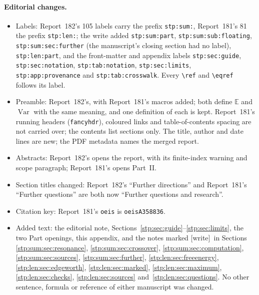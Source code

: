 \documentclass[11pt]{article}
\theoremstyle{remark}\newtheorem{remark}[theorem]{Remark}
\newcommand{\E}{\mathbb E}
\DeclareMathOperator{\Var}{Var}
\newcommand{\wtag}{\textup{[write]}}
\begin{document}
\paragraph{Editorial changes.}
\begin{itemize}
\item Labels: Report~182's 105 labels carry the prefix \texttt{stp:sum:},
Report~181's 81 the prefix \texttt{stp:len:}; the write added
\texttt{stp:sum:part}, \texttt{stp:sum:sub:floating},
\texttt{stp:sum:sec:further} (the manuscript's closing section had no
label), \texttt{stp:len:part}, and the front-matter and appendix labels
\texttt{stp:sec:guide}, \texttt{stp:sec:notation}, \texttt{stp:tab:notation},
\texttt{stp:sec:limits}, \texttt{stp:app:provenance} and
\texttt{stp:tab:crosswalk}. Every \verb|\ref| and \verb|\eqref| follows its
label.
\item Preamble: Report~182's, with Report~181's macros added; both define
$\E$ and $\Var$ with the same meaning, and one definition of each is kept.
Report~181's running headers (\texttt{fancyhdr}), coloured links and
table-of-contents spacing are not carried over; the contents list sections
only. The title, author and date lines are new; the PDF metadata names the
merged report.
\item Abstracts: Report~182's opens the report, with its finite-index
warning and scope paragraph; Report~181's opens Part~II.
\item Section titles changed: Report~182's ``Further directions'' and
Report~181's ``Further questions'' are both now ``Further questions and
research''.
\item Citation key: Report~181's \texttt{oeis} is \texttt{oeisA358836}.
\item Added text: the editorial note, Sections~\ref{stp:sec:guide}--\ref{stp:sec:limits},
the two Part openings, this appendix, and the notes marked \wtag\ in
Sections \ref{stp:sum:sec:resonance}, \ref{stp:sum:sec:crossover},
\ref{stp:sum:sec:computation}, \ref{stp:sum:sec:sources},
\ref{stp:sum:sec:further}, \ref{stp:len:sec:freeenergy},
\ref{stp:len:sec:edgeworth}, \ref{stp:len:sec:marked},
\ref{stp:len:sec:maximum}, \ref{stp:len:sec:checks},
\ref{stp:len:sec:sources} and~\ref{stp:len:sec:questions}. No other
sentence, formula or reference of either manuscript was changed.
\end{itemize}
\end{document}
